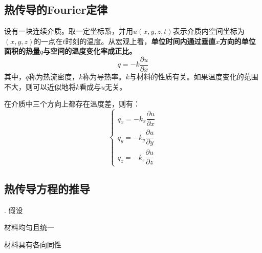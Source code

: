 \subsection{热传导的Fourier定律}
\ttheorem[一维Fourier定律]
设有一块连续介质。取一定坐标系，并用$u(x,y,z,t)$表示介质内空间坐标为$(x,y,z)$的一点在$t$时刻的温度。从宏观上看，\textbf{单位时间内通过垂直$x$方向的单位面积的热量$q$与空间的温度变化率成正比。}
\begin{equation}
	q = - k\frac{\partial u}{\partial x}
\end{equation}
其中，$q$称为热流密度，$k$称为导热率。$k$与材料的性质有关。如果温度变化的范围不大，则可以近似地将$k$看成与$u$无关。

\theorem[三维Fourier定律]
在介质中三个方向上都存在温度差，则有：
\begin{equation}
	\begin{cases}
		q_x = - k_x\dfrac{\partial u}{\partial x}\\[1em]
		q_y = - k_y\dfrac{\partial u}{\partial y}\\[1em]
		q_z = - k_z\dfrac{\partial u}{\partial z}
	\end{cases}
\end{equation}

\subsection{热传导方程的推导}
. 假设
\begin{myitemize}
	\item 材料均匀且统一\vspace*{-0.5em}
	\item 材料具有各向同性\vspace*{0.3em}
\end{myitemize}


